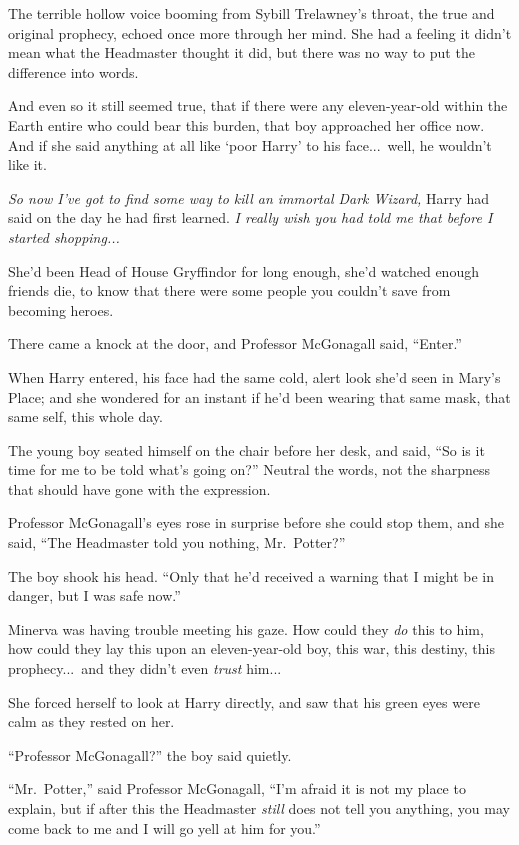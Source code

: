 The terrible hollow voice booming from Sybill Trelawney’s throat, the true and original prophecy, echoed once more through her mind. She had a feeling it didn’t mean what the Headmaster thought it did, but there was no way to put the difference into words.

And even so it still seemed true, that if there were any eleven-year-old within the Earth entire who could bear this burden, that boy approached her office now. And if she said anything at all like ‘poor Harry’ to his face...\ well, he wouldn’t like it.

\emph{So now I’ve got to find some way to kill an immortal Dark Wizard,} Harry had said on the day he had first learned.\emph{ I really wish you had told me that before I started shopping...}

She’d been Head of House Gryffindor for long enough, she’d watched enough friends die, to know that there were some people you couldn’t save from becoming heroes.

There came a knock at the door, and Professor McGonagall said, “Enter.”

When Harry entered, his face had the same cold, alert look she’d seen in Mary’s Place; and she wondered for an instant if he’d been wearing that same mask, that same self, this whole day.

The young boy seated himself on the chair before her desk, and said, “So is it time for me to be told what’s going on?” Neutral the words, not the sharpness that should have gone with the expression.

Professor McGonagall’s eyes rose in surprise before she could stop them, and she said, “The Headmaster told you nothing, Mr.~Potter?”

The boy shook his head. “Only that he’d received a warning that I might be in danger, but I was safe now.”

Minerva was having trouble meeting his gaze. How could they \emph{do} this to him, how could they lay this upon an eleven-year-old boy, this war, this destiny, this prophecy...\ and they didn’t even \emph{trust} him...

She forced herself to look at Harry directly, and saw that his green eyes were calm as they rested on her.

“Professor McGonagall?” the boy said quietly.

“Mr.~Potter,” said Professor McGonagall, “I’m afraid it is not my place to explain, but if after this the Headmaster \emph{still} does not tell you anything, you may come back to me and I will go yell at him for you.”

